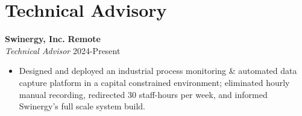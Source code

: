 \documentclass[letterpaper,10pt]{article}
\newenvironment{tightitemize}{%
  \begin{itemize}[
    itemsep=0pt, %
    topsep=0pt, %
    leftmargin=12pt, %
    rightmargin=60pt, %
    parsep=0pt,
    partopsep=0pt,
    label=\scriptsize$\bullet$ %
  ]%
  \footnotesize
}{%
  \end{itemize}
}
\begin{document}
\section{Technical Advisory}
    \textbf{Swinergy, Inc.} \hfill \textbf{Remote} \\
    \hspace*{0.5pt}\textit{Technical Advisor} \hfill 2024\hspace{2pt}-\hspace{2pt}Present \\
        \vspace{-16pt}
        \begin{tightitemize}
            \item Designed and deployed an industrial process monitoring \& automated data capture platform in a capital constrained environment; eliminated hourly manual recording, redirected 30 staff-hours per week, and informed Swinergy's full scale system build.
        \end{tightitemize}
        \vspace{-2pt}
\medskip
\end{document}
